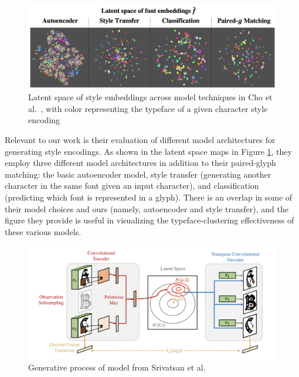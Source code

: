 \begin{figure}[]
    \centering
    \includegraphics[width=1\textwidth]{images/cho-latent-space.png}
    \caption{Latent space of style embeddings across model techniques in Cho et al.\ \cite{cho2022}, with color representing the typeface of a given character style encoding}
    \label{fig:cho-latent-space}
\end{figure}

Relevant to our work is their evaluation of different model architectures for generating style encodings. As shown in the latent space maps in Figure \ref{fig:cho-latent-space}, they employ three different model architectures in addition to their paired-glyph matching: the basic autoencoder model, style transfer (generating another character in the same font given an input character), and classification (predicting which font is represented in a glyph). There is an overlap in some of their model choices and ours (namely, autoencoder and style transfer), and the figure they provide is useful in visualizing the typeface-clustering effectiveness of these various models.

\begin{figure}[]
    \centering
    \includegraphics[width=1\textwidth]{images/srivatsan-model.png}
    \caption{Generative process of model from Srivatsan et al.\ \cite{srivatsan2020}}
    \label{fig:srivatsan-model}
\end{figure}


